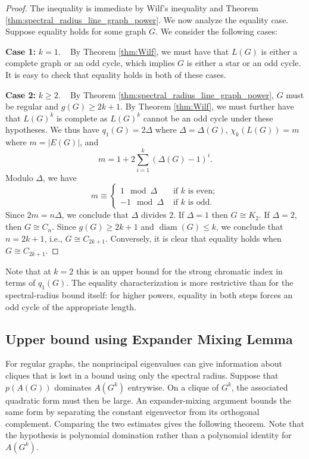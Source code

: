\documentclass[10pt,a4paper]{article}
\theoremstyle{plain}
\numberwithin{equation}{section}
\DeclareMathOperator{\diam}{diam}
\begin{document}
\begin{proof} The inequality is immediate by Wilf's inequality and Theorem \ref{thm:spectral_radius_line_graph_power}. We now analyze the equality case. Suppose equality holds for some graph $G$. We consider the following cases:

\textbf{Case 1:} $k=1$. ~ By Theorem \ref{thm:Wilf}, we must have that $L(G)$ is either a complete graph or an odd cycle, which implies $G$ is either a star or an odd cycle. It is easy to check that equality holds in both of these cases. 

\textbf{Case 2:} $k\ge 2$. ~ By Theorem \ref{thm:spectral_radius_line_graph_power}, $G$ must be regular and $g(G)\ge 2k+1$. By Theorem \ref{thm:Wilf}, we must further have that $L(G)^k$ is complete as $L(G)^k$ cannot be an odd cycle under these hypotheses. We thus have $q_1(G) = 2\Delta$ where $\Delta = \Delta(G)$, $\chi_k(L(G)) = m$ where $m = |E(G)|$, and 
\[ m = 1 + 2 \sum_{i=1}^k (\Delta(G)-1)^i. \]
Modulo $\Delta$, we have
\begin{equation}
    m \equiv 
    \begin{cases}
    1 \mod \Delta & \text{ if } k \text{ is even};\\
    -1 \mod \Delta & \text{ if } k \text{ is odd}.
    \end{cases}
\end{equation}
Since $2m = n\Delta$, we conclude that $\Delta$ divides $2$. If $\Delta = 1$ then $G\cong K_2$. If $\Delta = 2$, then $G\cong C_n$. Since $g(G)\ge 2k+1$ and $\diam(G)\le k$, we conclude that $n = 2k+1$, i.e., $G\cong C_{2k+1}$. Conversely, it is clear that equality holds when $G\cong C_{2k+1}$. 
\end{proof}

Note that at $k=2$ this is an upper bound for the strong chromatic index in terms of $q_1(G)$. The equality characterization is more restrictive than for the spectral-radius bound itself: for higher powers, equality in both steps forces an odd cycle of the appropriate length.

\subsection{Upper bound using Expander Mixing Lemma}

For regular graphs, the nonprincipal eigenvalues can give information about cliques that is lost in a bound using only the spectral radius. Suppose that $p(A(G))$ dominates $A(G^k)$ entrywise. On a clique of $G^k$, the associated quadratic form must then be large. An expander-mixing argument bounds the same form by separating the constant eigenvector from its orthogonal complement. Comparing the two estimates gives the following theorem. Note that the hypothesis is polynomial domination rather than a polynomial identity for $A(G^k)$.
\end{document}
